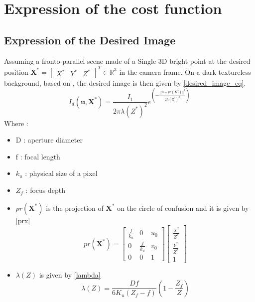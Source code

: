 \section{Expression of the cost function}
\subsection{Expression of the Desired Image}
Assuming a fronto-parallel scene made of a Single 3D bright point at the desired position $\textbf{X}^{*} = \begin{bmatrix}
    X^{*}&Y^{*}&Z^{*}
\end{bmatrix}^{T}\in \mathbb{R}^{3}$ in the camera frame. On a dark textureless background, based on \cite{caron_defocus_based_2021}, the desired image is then given by \eqref{desired_image_eq}.
\begin{equation}
    I_{d}(\textbf{u},\textbf{X}^{*})=\frac{I_{1}}{2\pi\lambda(Z^{*})^{2}} e^{\left(-\frac{||\textbf{u}-pr(\textbf{X}^{*})||^{2}}{2\lambda(Z^{*})^{2}}\right)}
    \label{desired_image_eq}
\end{equation}
Where :
\begin{itemize}
    \item D : aperture diameter
    \item f : focal length
    \item $k_{u}$ : physical size of a pixel
    \item $Z_{f}$ : focus depth
    \item $pr(\textbf{X}^{*})$ is the projection of $\textbf{X}^{*}$ on the circle of confusion and it is given by \eqref{prx}
    \begin{equation}
        pr(\textbf{X}^{*}) = \begin{bmatrix}
    \frac{f}{k_{u}} & 0 & u_{0} \\
    0 & \frac{f}{k_{u}} & v_{0} \\
    0 & 0 & 1
\end{bmatrix}\begin{bmatrix}
    \frac{X^{*}}{Z^{*}}\\
    \frac{Y^{*}}{Z^{*}}\\
    1
\end{bmatrix}
\label{prx}
\end{equation}
\item $\lambda(Z)$ is given by \eqref{lambda}
\begin{equation}
    \lambda (Z) = \frac{Df}{6K_{u}(Z_{f}-f)}\left(1 - \frac{Z_{f}}{Z}\right)
    \label{lambda}
\end{equation}
\end{itemize}

